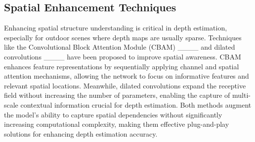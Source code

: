 \subsection{Spatial Enhancement Techniques}
Enhancing spatial structure understanding is critical in depth estimation, especially for outdoor scenes where depth maps are usually sparse. Techniques like the Convolutional Block Attention Module (CBAM) ____ and dilated convolutions ____ have been proposed to improve spatial awareness. CBAM enhances feature representations by sequentially applying channel and spatial attention mechanisms, allowing the network to focus on informative features and relevant spatial locations. Meanwhile, dilated convolutions expand the receptive field without increasing the number of parameters, enabling the capture of multi-scale contextual information crucial for depth estimation. Both methods augment the model's ability to capture spatial dependencies without significantly increasing computational complexity, making them effective plug-and-play solutions for enhancing depth estimation accuracy.